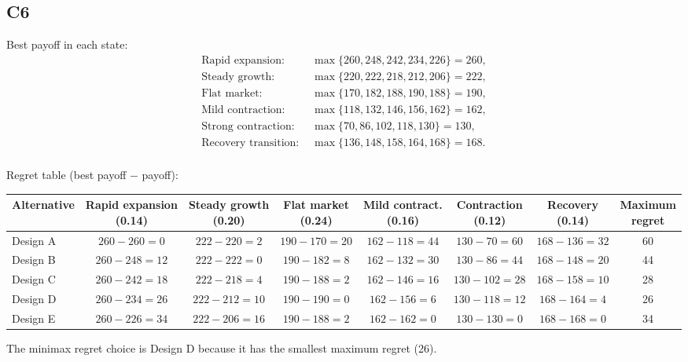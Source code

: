 \begin{ExamProblems}
		\subsection*{C6}
		Best payoff in each state:
		\[
		\begin{aligned}
			\text{Rapid expansion: } &\max\{260, 248, 242, 234, 226\} = 260, \\
			\text{Steady growth: } &\max\{220, 222, 218, 212, 206\} = 222, \\
			\text{Flat market: } &\max\{170, 182, 188, 190, 188\} = 190, \\
			\text{Mild contraction: } &\max\{118, 132, 146, 156, 162\} = 162, \\
			\text{Strong contraction: } &\max\{70, 86, 102, 118, 130\} = 130, \\
			\text{Recovery transition: } &\max\{136, 148, 158, 164, 168\} = 168. \\
		\end{aligned}
		\]
		\begin{center} Regret table (best payoff $-$ payoff): \end{center}
		\hspace*{-2cm}%
		\begin{tabular}{l c c c c c c c}
			\toprule
			Alternative 
			& \shortstack{Rapid expansion\\(0.14)} 
			& \shortstack{Steady growth\\(0.20)} 
			& \shortstack{Flat market\\(0.24)} 
			& \shortstack{Mild contract.\\(0.16)} 
			& \shortstack{Contraction\\(0.12)} 
			& \shortstack{Recovery\\(0.14)} 
			& \shortstack{Maximum\\regret} \\
			\midrule
			Design A & $260-260=0$ & $222-220=2$ & $190-170=20$ & $162-118=44$ & $130-70=60$ & $168-136=32$ & 60 \\
			Design B & $260-248=12$ & $222-222=0$ & $190-182=8$ & $162-132=30$ & $130-86=44$ & $168-148=20$ & 44 \\
			Design C & $260-242=18$ & $222-218=4$ & $190-188=2$ & $162-146=16$ & $130-102=28$ & $168-158=10$ & 28 \\
			Design D & $260-234=26$ & $222-212=10$ & $190-190=0$ & $162-156=6$ & $130-118=12$ & $168-164=4$ & 26 \\
			Design E & $260-226=34$ & $222-206=16$ & $190-188=2$ & $162-162=0$ & $130-130=0$ & $168-168=0$ & 34 \\
			\bottomrule
		\end{tabular}
		
		The minimax regret choice is Design D because it has the smallest maximum regret (26).
	\end{ExamProblems}

